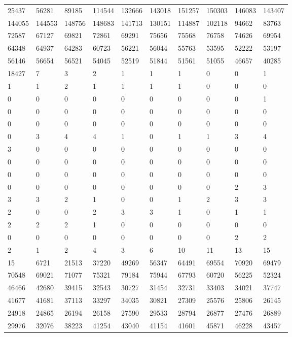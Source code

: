 \documentclass[reqno, 11pt]{amsart}
\theoremstyle{remark}
\begin{document}
\begin{longtable}{llllllllll}
25437 & 56281 & 89185 & 114544 & 132666 & 143018 & 151257 & 150303 & 146083 & 143407 \\
144055 & 144553 & 148756 & 148683 & 141713 & 130151 & 114887 & 102118 & 94662 & 83763 \\
72587 & 67127 & 69821 & 72861 & 69291 & 75656 & 75568 & 76758 & 74626 & 69954 \\
64348 & 64937 & 64283 & 60723 & 56221 & 56044 & 55763 & 53595 & 52222 & 53197 \\
56146 & 56654 & 56521 & 54045 & 52519 & 51844 & 51561 & 51055 & 46657 & 40285 \\
18427 & 7 & 3 & 2 & 1 & 1 & 1 & 0 & 0 & 1 \\
1 & 1 & 2 & 1 & 1 & 1 & 1 & 0 & 0 & 0 \\
0 & 0 & 0 & 0 & 0 & 0 & 0 & 0 & 0 & 1 \\
0 & 0 & 0 & 0 & 0 & 0 & 0 & 0 & 0 & 0 \\
0 & 0 & 0 & 0 & 0 & 0 & 0 & 0 & 0 & 0 \\
0 & 3 & 4 & 4 & 1 & 0 & 1 & 1 & 3 & 4 \\
3 & 0 & 0 & 0 & 0 & 0 & 0 & 0 & 0 & 0 \\
0 & 0 & 0 & 0 & 0 & 0 & 0 & 0 & 0 & 0 \\
0 & 0 & 0 & 0 & 0 & 0 & 0 & 0 & 0 & 0 \\
0 & 0 & 0 & 0 & 0 & 0 & 0 & 0 & 2 & 3 \\
3 & 3 & 2 & 1 & 0 & 0 & 1 & 2 & 3 & 3 \\
2 & 0 & 0 & 2 & 3 & 3 & 1 & 0 & 1 & 1 \\
2 & 2 & 2 & 1 & 0 & 0 & 0 & 0 & 0 & 0 \\
0 & 0 & 0 & 0 & 0 & 0 & 0 & 0 & 2 & 2 \\
2 & 1 & 2 & 4 & 3 & 6 & 10 & 11 & 13 & 15 \\
15 & 6721 & 21513 & 37220 & 49269 & 56347 & 64491 & 69554 & 70920 & 69479 \\
70548 & 69021 & 71077 & 75321 & 79184 & 75944 & 67793 & 60720 & 56225 & 52324 \\
46466 & 42680 & 39415 & 32543 & 30727 & 31454 & 32731 & 33403 & 34021 & 37747 \\
41677 & 41681 & 37113 & 33297 & 34035 & 30821 & 27309 & 25576 & 25806 & 26145 \\
24918 & 24865 & 26194 & 26158 & 27590 & 29533 & 28794 & 26877 & 27476 & 26889 \\
29976 & 32076 & 38223 & 41254 & 43040 & 41154 & 41601 & 45871 & 46228 & 43457 \\

\end{longtable}
\end{document}
